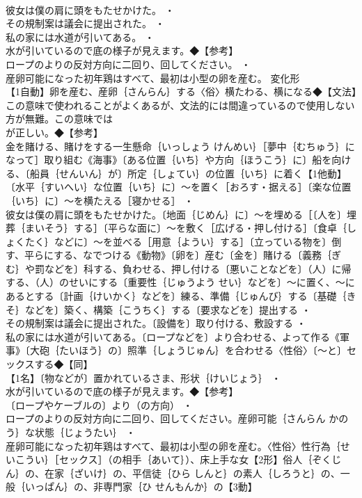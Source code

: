 \documentclass[8pt]{extreport}
\begin{document}
\begin{CJK}{UTF8}{min}
\\	彼女は僕の肩に頭をもたせかけた。 ・
\\	その規制案は議会に提出された。 ・
\\	私の家には水道が引いてある。 ・
\\	水が引いているので底の様子が見えます。◆【参考】
\\	ロープのよりの反対方向に二回り、回してください。 ・
\\	産卵可能になった初年鶏はすべて、最初は小型の卵を産む。	変化形 
\\	【1自動】卵を産む、産卵｛さんらん｝する〈俗〉横たわる、横になる◆【文法】この意味で使われることがよくあるが、文法的には間違っているので使用しない方が無難。この意味では
\\	が正しい。◆【参考】
\\	金を賭ける、賭けをする一生懸命｛いっしょう けんめい｝［夢中｛むちゅう｝になって］取り組む《海事》〔ある位置｛いち｝や方向｛ほうこう｝に〕船を向ける、〔船員｛せんいん｝が〕所定｛しょてい｝の位置｛いち｝に着く【1他動】〔水平｛すいへい｝な位置｛いち｝に〕～を置く［おろす・据える］〔楽な位置｛いち｝に〕～を横たえる［寝かせる］ ・
\\	彼女は僕の肩に頭をもたせかけた。〔地面｛じめん｝に〕～を埋める［〔人を〕埋葬｛まいそう｝する］〔平らな面に〕～を敷く［広げる・押し付ける］〔食卓｛しょくたく｝などに〕～を並べる［用意｛ようい｝する］〔立っている物を〕倒す、平らにする、なでつける《動物》〔卵を〕産む〔金を〕賭ける〔義務｛ぎむ｝や罰などを〕科する、負わせる、押し付ける〔悪いことなどを〕（人）に帰する、（人）のせいにする〔重要性｛じゅうよう せい｝などを〕～に置く、～にあるとする〔計画｛けいかく｝などを〕練る、準備｛じゅんび｝する〔基礎｛きそ｝などを〕築く、構築｛こうちく｝する〔要求などを〕提出する ・
\\	その規制案は議会に提出された。〔設備を〕取り付ける、敷設する ・
\\	私の家には水道が引いてある。〔ロープなどを〕より合わせる、よって作る《軍事》〔大砲｛たいほう｝の〕照準｛しょうじゅん｝を合わせる〈性俗〉〔～と〕セックスする◆【同】
\\	【1名】〔物などが〕置かれているさま、形状｛けいじょう｝ ・
\\	水が引いているので底の様子が見えます。◆【参考】
\\	〔ロープやケーブルの〕より（の方向） ・
\\	ロープのよりの反対方向に二回り、回してください。産卵可能｛さんらん かのう｝な状態｛じょうたい｝ ・
\\	産卵可能になった初年鶏はすべて、最初は小型の卵を産む。〈性俗〉性行為｛せいこうい｝［セックス］（の相手｛あいて｝）、床上手な女【2形】俗人｛ぞくじん｝の、在家｛ざいけ｝の、平信徒｛ひら しんと｝の素人｛しろうと｝の、一般｛いっぱん｝の、非専門家｛ひ せんもんか｝の【3動】

\end{CJK}
\end{document}

